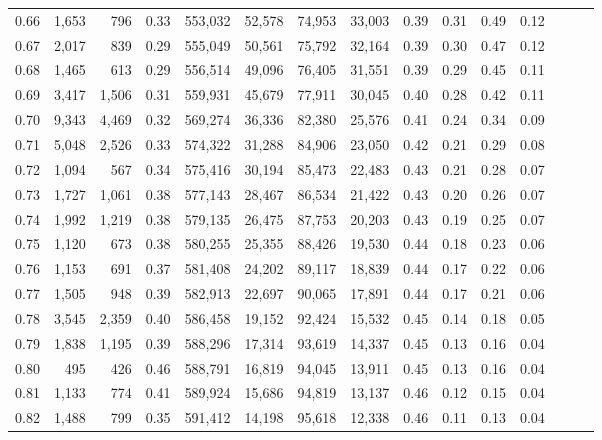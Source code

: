 \begin{tabular}{rrrrrrrrrrrrrrr}
0.66 &   1,653 &    796 &  0.33 &  553,032 &   52,578 &   74,953 &   33,003 &  0.39 &  0.31 &  0.49 &      0.12 \\
0.67 &   2,017 &    839 &  0.29 &  555,049 &   50,561 &   75,792 &   32,164 &  0.39 &  0.30 &  0.47 &      0.12 \\
0.68 &   1,465 &    613 &  0.29 &  556,514 &   49,096 &   76,405 &   31,551 &  0.39 &  0.29 &  0.45 &      0.11 \\
0.69 &   3,417 &  1,506 &  0.31 &  559,931 &   45,679 &   77,911 &   30,045 &  0.40 &  0.28 &  0.42 &      0.11 \\
0.70 &   9,343 &  4,469 &  0.32 &  569,274 &   36,336 &   82,380 &   25,576 &  0.41 &  0.24 &  0.34 &      0.09 \\
0.71 &   5,048 &  2,526 &  0.33 &  574,322 &   31,288 &   84,906 &   23,050 &  0.42 &  0.21 &  0.29 &      0.08 \\
0.72 &   1,094 &    567 &  0.34 &  575,416 &   30,194 &   85,473 &   22,483 &  0.43 &  0.21 &  0.28 &      0.07 \\
0.73 &   1,727 &  1,061 &  0.38 &  577,143 &   28,467 &   86,534 &   21,422 &  0.43 &  0.20 &  0.26 &      0.07 \\
0.74 &   1,992 &  1,219 &  0.38 &  579,135 &   26,475 &   87,753 &   20,203 &  0.43 &  0.19 &  0.25 &      0.07 \\
0.75 &   1,120 &    673 &  0.38 &  580,255 &   25,355 &   88,426 &   19,530 &  0.44 &  0.18 &  0.23 &      0.06 \\
0.76 &   1,153 &    691 &  0.37 &  581,408 &   24,202 &   89,117 &   18,839 &  0.44 &  0.17 &  0.22 &      0.06 \\
0.77 &   1,505 &    948 &  0.39 &  582,913 &   22,697 &   90,065 &   17,891 &  0.44 &  0.17 &  0.21 &      0.06 \\
0.78 &   3,545 &  2,359 &  0.40 &  586,458 &   19,152 &   92,424 &   15,532 &  0.45 &  0.14 &  0.18 &      0.05 \\
0.79 &   1,838 &  1,195 &  0.39 &  588,296 &   17,314 &   93,619 &   14,337 &  0.45 &  0.13 &  0.16 &      0.04 \\
0.80 &     495 &    426 &  0.46 &  588,791 &   16,819 &   94,045 &   13,911 &  0.45 &  0.13 &  0.16 &      0.04 \\
0.81 &   1,133 &    774 &  0.41 &  589,924 &   15,686 &   94,819 &   13,137 &  0.46 &  0.12 &  0.15 &      0.04 \\
0.82 &   1,488 &    799 &  0.35 &  591,412 &   14,198 &   95,618 &   12,338 &  0.46 &  0.11 &  0.13 &      0.04 \\

\end{tabular}

